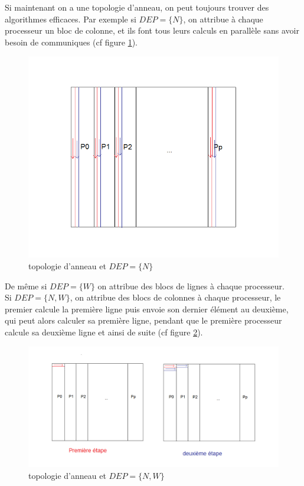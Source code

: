 \documentclass[a4paper,11pt]{article}
\begin{document}
\\
\\
Si maintenant on a une topologie d'anneau, on peut toujours trouver des algorithmes efficaces. Par exemple si $DEP = \{N\}$, on attribue à chaque processeur un bloc de colonne, et ils font tous leurs calculs en parallèle sans avoir besoin de communiques (cf figure \ref{anneau1}).
\begin{figure}[!h]
\includegraphics[scale=0.5]{anneau1.png}
\caption{topologie d'anneau et $DEP = \{N\}$}
\label{anneau1}
\end{figure}
De même si $DEP = \{W\}$ on attribue des blocs de lignes à chaque processeur.\\
Si $DEP = \{N,W\}$, on attribue des blocs de colonnes à chaque processeur, le premier calcule la première ligne puis envoie son dernier élément au deuxième, qui peut alors calculer sa première ligne, pendant que le première processeur calcule sa deuxième ligne et ainsi de suite (cf figure \ref{anneau2}).
\begin{figure}[!h]
\includegraphics[scale=0.5]{anneau2.png}
\caption{topologie d'anneau et $DEP = \{N,W\}$}
\label{anneau2}
\end{figure}
\end{document}

